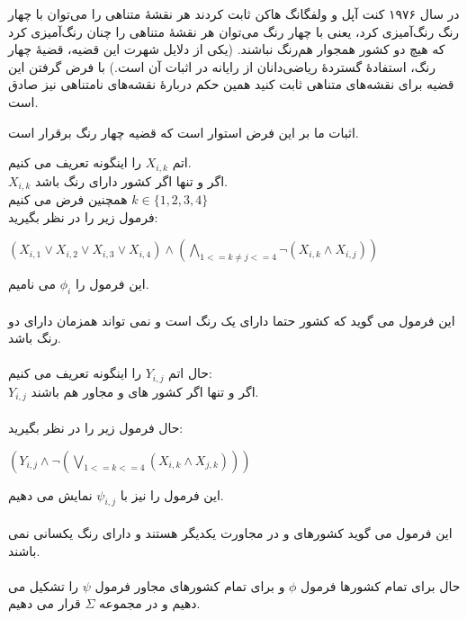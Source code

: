 در سال ۱۹۷۶ کنت آپل و ولفگانگ هاکن ثابت کردند هر نقشهٔ متناهی را می‌توان با چهار رنگ رنگ‌آمیزی کرد، یعنی با چهار رنگ می‌توان هر نقشهٔ متناهی را چنان رنگ‌آمیزی کرد که هیچ دو کشور همجوار هم‌رنگ نباشند. (یکی از دلایل شهرت این قضیه، قضیهٔ چهار رنگ، استفادهٔ گستردهٔ ریاضی‌دانان از رایانه در اثبات آن است.) با فرض گرفتن این قضیه برای نقشه‌های متناهی ثابت کنید همین حکم دربارهٔ نقشه‌های نامتناهی نیز صادق است.


\begin{ans}
    اثبات ما بر این فرض استوار است که قضیه چهار رنگ برقرار است.

    اتم 
    $X_{i,k}$
    را اینگونه تعریف می کنیم.
    \\
    $X_{i,k}$
    اگر و تنها اگر کشور 
    دارای رنگ 
    باشد.
    \\
    همچنین فرض می کنیم 
    $k \in \{1,2,3,4\}$
    \\
    فرمول زیر را در نظر بگیرید:
    \begin{flushleft}
        $(X_{i,1} \lor X_{i,2} \lor X_{i,3} \lor X_{i,4}) \land (\underset{\text{$1<=k \neq j<= 4$}}{\bigwedge}\neg(X_{i,k} \wedge X_{i,j}))$
    \end{flushleft}
    این فرمول را 
    $\phi_{i}$
    می نامیم.
    \\
    \\
    این فرمول می گوید که کشور 
    حتما دارای یک رنگ است و نمی تواند همزمان دارای دو رنگ باشد. 
    \\
    \\
    حال اتم 
    $Y_{i,j}$
    را اینگونه تعریف می کنیم:
    \\
    $Y_{i,j}$
    اگر و تنها اگر کشور های 
    و
    مجاور هم باشند.
    \\
    \\
    حال فرمول زیر را در نظر بگیرید:
    \begin{flushleft}
        $(Y_{i,j} \wedge \neg(\underset{\text{$1 <= k <= 4$}}{\bigvee} (X_{i,k} \wedge X_{j,k})))$
    \end{flushleft}
    این فرمول را نیز با 
    $\psi_{i,j}$
    نمایش می دهیم. 
    \\
    \\
    این فرمول می گوید کشورهای 
    و
    در مجاورت یکدیگر هستند و دارای رنگ یکسانی نمی باشند. 
    \\
    \\
    حال برای تمام کشورها فرمول 
    $\phi$
    و برای تمام کشورهای مجاور فرمول
    $\psi$
    را تشکیل می دهیم و در مجموعه 
    $\Sigma$
    قرار می دهیم. 


\end{ans}
